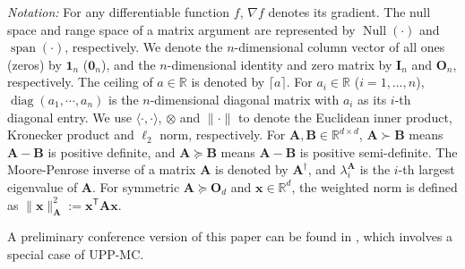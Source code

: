 \documentclass[12pt,draftcls,onecolumn]{IEEEtran}
\begin{document}
\emph{Notation:} For any differentiable function $f$, $\nabla f$ denotes its gradient. The null space and range space of a matrix argument are represented by $\operatorname{Null}(\cdot)$ and $\operatorname{span}(\cdot)$, respectively. We denote the $n$-dimensional column vector of all ones (zeros) by $\mathbf{1}_n$ ($\mathbf{0}_n$), and the $n$-dimensional identity and zero matrix by $\mathbf{I}_n$ and $\mathbf{O}_n$, respectively. The ceiling of $a\in\mathbb{R}$ is denoted by $\lceil a \rceil$. For $a_i\in \mathbb{R}$ ($i=1,\dots,n$), $\operatorname{diag}(a_1,\cdots,a_n)$ is the $n$-dimensional diagonal matrix with $a_i$ as its $i$-th diagonal entry. We use $\langle \cdot,\cdot \rangle$, $\otimes$ and $\|\cdot\|$ to denote the Euclidean inner product, Kronecker product and $\ell_2$ norm, respectively. For $\mathbf{A},\mathbf{B}\in \mathbb{R}^{d\times d}$, $\mathbf{A}\succ \mathbf{B}$ means $\mathbf{A}-\mathbf{B}$ is positive definite, and $\mathbf{A} \succeq \mathbf{B}$ means $\mathbf{A}-\mathbf{B}$ is positive semi-definite. The Moore-Penrose inverse of a matrix $\mathbf{A}$ is denoted by $\mathbf{A}^{\dagger}$, and $\lambda_i^\mathbf{A}$ is the $i$-th largest eigenvalue of $\mathbf{A}$. For symmetric $\mathbf{A} \succeq \mathbf{O}_d$ and $\mathbf{x}\in \mathbb{R}^d$, the weighted norm is defined as $\|\mathbf{x}\|^2_\mathbf{A}:=\mathbf{x}^{\mathsf{T}}\mathbf{A}\mathbf{x}$.

A preliminary conference version of this paper can be found in \cite{mappro2024Ou}, which involves a special case of UPP-MC.
\end{document}
